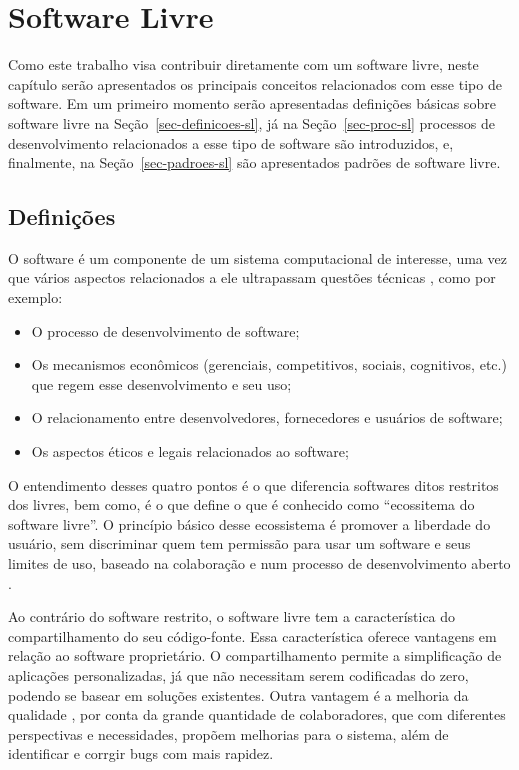 \chapter{Software Livre}

Como este trabalho visa contribuir diretamente com um software livre, neste capítulo serão apresentados os principais conceitos relacionados com esse tipo de software. Em um primeiro momento serão apresentadas definições básicas sobre software livre na Seção~\ref{sec-definicoes-sl}, já na Seção~\ref{sec-proc-sl} processos de desenvolvimento relacionados a esse tipo de software são introduzidos, e, finalmente, na Seção~\ref{sec-padroes-sl} são apresentados padrões de software livre.

\section{Definições}

O software é um componente de um sistema computacional de interesse, uma vez que vários aspectos relacionados a ele ultrapassam questões técnicas \cite{meirelles2013metrics}, como por exemplo: 

\begin{itemize}
\item O processo de desenvolvimento de software;
\item Os mecanismos econômicos (gerenciais, competitivos, sociais, cognitivos, etc.) que regem esse desenvolvimento e seu uso;
\item O relacionamento entre desenvolvedores, fornecedores e usuários de software;
\item Os aspectos éticos e legais relacionados ao software;
\end{itemize}

O entendimento desses quatro pontos é o que diferencia softwares ditos restritos dos livres, bem como, é o que define o que é conhecido como ``ecossitema do software livre''. O princípio básico desse ecossistema é promover a liberdade do usuário, sem discriminar quem tem permissão para usar um software e seus limites de uso, baseado na colaboração e num processo de desenvolvimento aberto \cite{meirelles2013metrics}.

Ao contrário do software restrito, o software livre tem a característica do compartilhamento do seu código-fonte. Essa característica oferece vantagens em relação ao software proprietário. O compartilhamento permite a simplificação de aplicações personalizadas, já que não necessitam serem codificadas do zero, podendo se basear em soluções existentes. Outra vantagem é a melhoria da qualidade \cite{Raymond, 1999}, por conta da grande quantidade de colaboradores, que com diferentes perspectivas e necessidades, propõem melhorias para o sistema, além de identificar e corrgir bugs com mais rapidez.


